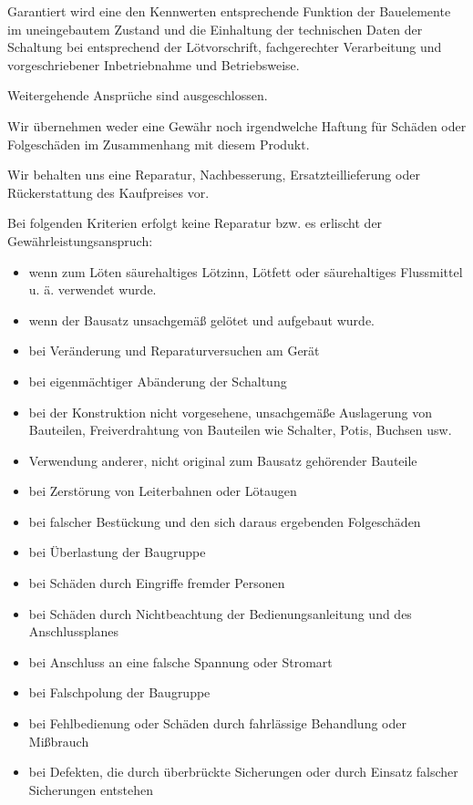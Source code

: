 \documentclass[fleqn,10pt]{SelfArx} %
\begin{document}
Garantiert wird eine den Kennwerten entsprechende Funktion der Bauelemente im uneingebautem Zustand und die Einhaltung der technischen Daten der Schaltung bei entsprechend der Lötvorschrift,
fachgerechter Verarbeitung und vorgeschriebener Inbetriebnahme und Betriebsweise.

Weitergehende Ansprüche sind ausgeschlossen.

Wir übernehmen weder eine Gewähr noch irgendwelche Haftung für Schäden oder Folgeschäden im Zusammenhang mit diesem Produkt.

Wir behalten uns eine Reparatur, Nachbesserung, Ersatzteillieferung oder Rückerstattung des Kaufpreises vor.

Bei folgenden Kriterien erfolgt keine Reparatur bzw. es erlischt der Gewährleistungsanspruch:

\begin{itemize}[noitemsep] %
\item wenn zum Löten säurehaltiges Lötzinn, Lötfett oder säurehaltiges Flussmittel u. ä. verwendet wurde.
\item wenn der Bausatz unsachgemäß gelötet und aufgebaut wurde.
\item bei Veränderung und Reparaturversuchen am Gerät
\item bei eigenmächtiger Abänderung der Schaltung
\item bei der Konstruktion nicht vorgesehene, unsachgemäße Auslagerung von Bauteilen, Freiverdrahtung von Bauteilen wie Schalter, Potis,
Buchsen usw.
\item Verwendung anderer, nicht original zum Bausatz gehörender Bauteile
\item bei Zerstörung von Leiterbahnen oder Lötaugen
\item bei falscher Bestückung und den sich daraus ergebenden Folgeschäden
\item bei Überlastung der Baugruppe
\item bei Schäden durch Eingriffe fremder Personen
\item bei Schäden durch Nichtbeachtung der Bedienungsanleitung und des Anschlussplanes
\item bei Anschluss an eine falsche Spannung oder Stromart
\item bei Falschpolung der Baugruppe
\item bei Fehlbedienung oder Schäden durch fahrlässige Behandlung oder Mißbrauch
\item bei Defekten, die durch überbrückte Sicherungen oder durch Einsatz falscher Sicherungen entstehen
\end{itemize}
\end{document}
